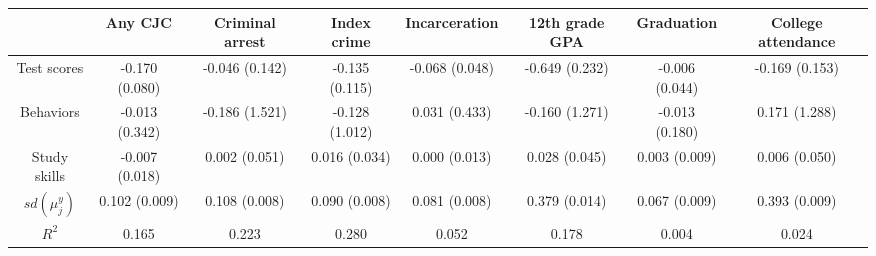 \begin{tabular}{cccccccc}
\toprule
 & Any CJC & Criminal arrest & Index crime & Incarceration & 12th grade GPA & Graduation & College attendance \\
\midrule
Test scores & -0.170 (0.080) & -0.046 (0.142) & -0.135 (0.115) & -0.068 (0.048) & -0.649 (0.232) & -0.006 (0.044) & -0.169 (0.153) \\
Behaviors & -0.013 (0.342) & -0.186 (1.521) & -0.128 (1.012) & 0.031 (0.433) & -0.160 (1.271) & -0.013 (0.180) & 0.171 (1.288) \\
Study skills & -0.007 (0.018) & 0.002 (0.051) & 0.016 (0.034) & 0.000 (0.013) & 0.028 (0.045) & 0.003 (0.009) & 0.006 (0.050) \\
\hline $sd(\mu_j^y)$ & 0.102 (0.009) & 0.108 (0.008) & 0.090 (0.008) & 0.081 (0.008) & 0.379 (0.014) & 0.067 (0.009) & 0.393 (0.009) \\
$R^2$ & 0.165 & 0.223 & 0.280 & 0.052 & 0.178 & 0.004 & 0.024 \\
\bottomrule
\end{tabular}
